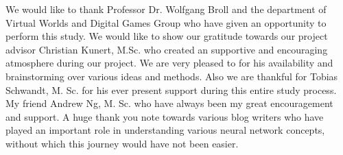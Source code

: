 \documentclass[
11pt, %
english, %
singlespacing, %
headsepline, %
]{mediaproject} %
\begin{document}

\begin{acknowledgements}
\addchaptertocentry{\acknowledgementname} %
We would like to thank Professor Dr. Wolfgang Broll and the department of Virtual Worlds and Digital Games Group who have given an opportunity to perform this study. We would like to show our gratitude towards our project advisor Christian Kunert, M.Sc. who created an supportive and encouraging atmosphere during our project. We are very pleased to for his availability and brainstorming over various ideas and methods. Also we are thankful for Tobias Schwandt, M. Sc. for his ever present support during this entire study process. My friend Andrew Ng, M. Sc. who have always been my great encouragement and support. A huge thank you note towards various blog writers who have played an important role in understanding various neural network concepts, without which this journey would have not been easier. 


\end{acknowledgements}


\tableofcontents %

\listoffigures %

\listoftables %



%
\end{document}
